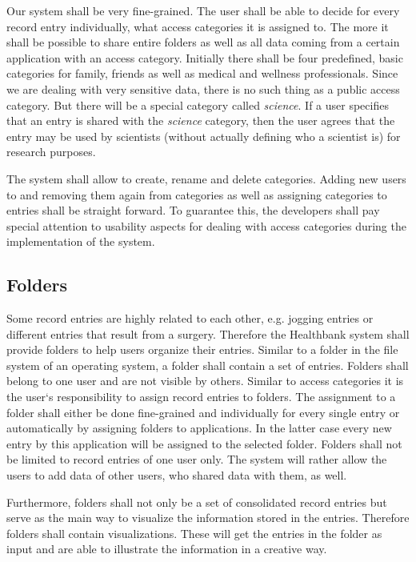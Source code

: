 Our system shall be very fine-grained. The user shall be able to decide for every record entry individually, what access categories it is assigned to. The more it shall be possible to share entire folders as well as all data coming from a certain application with an access category. Initially there shall be four predefined, basic categories for family, friends as well as medical and wellness professionals. Since we are dealing with very sensitive data, there is no such thing as a public access category. But there will be a special category called \emph{science}. If a user specifies that an entry is shared with the \emph{science} category, then the user agrees that the entry may be used by scientists (without actually defining who a scientist is) for research purposes.

The system shall allow to create, rename and delete categories. Adding new users to and removing them again from categories as well as assigning categories to entries shall be straight forward. To guarantee this, the developers shall pay special attention to usability aspects for dealing with access categories during the implementation of the system.

\subsection{Folders} 

Some record entries are highly related to each other, e.g. jogging entries or different entries that result from a surgery. Therefore the Healthbank system shall provide folders to help users organize their entries. Similar to a folder in the file system of an operating system, a folder shall contain a set of entries. Folders shall belong to one user and are not visible by others. Similar to access categories it is the user`s responsibility to assign record entries to folders. The assignment to a folder shall either be done fine-grained and individually for every single entry or automatically by assigning folders to applications. In the latter case every new entry by this application will be assigned to the selected folder. \newline
Folders shall not be limited to record entries of one user only. The system will rather allow the users to add data of other users, who shared data with them, as well.

Furthermore, folders shall not only be a set of consolidated record entries but serve as the main way to visualize the information stored in the entries. Therefore folders shall contain visualizations. These will get the entries in the folder as input and are able to illustrate the information in a creative way. 

